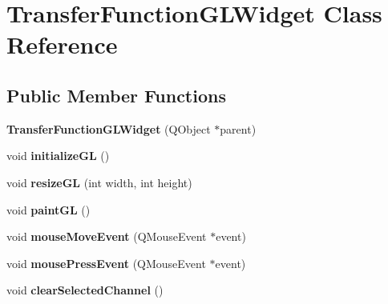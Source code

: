 \hypertarget{class_transfer_function_g_l_widget}{\section{\-Transfer\-Function\-G\-L\-Widget \-Class \-Reference}
\label{class_transfer_function_g_l_widget}
}
\subsection*{\-Public \-Member \-Functions}
\begin{DoxyCompactItemize}
\item 
\hypertarget{class_transfer_function_g_l_widget_afca47789bf3dba39c9e5dbaf334ddf0b}{{\bfseries \-Transfer\-Function\-G\-L\-Widget} (\-Q\-Object $\ast$parent)}\label{class_transfer_function_g_l_widget_afca47789bf3dba39c9e5dbaf334ddf0b}

\item 
\hypertarget{class_transfer_function_g_l_widget_a0265d1baafc123816c995168b024c1fe}{void {\bfseries initialize\-G\-L} ()}\label{class_transfer_function_g_l_widget_a0265d1baafc123816c995168b024c1fe}

\item 
\hypertarget{class_transfer_function_g_l_widget_a195a79448e90a6c0fedaa04d4f5eb3d5}{void {\bfseries resize\-G\-L} (int width, int height)}\label{class_transfer_function_g_l_widget_a195a79448e90a6c0fedaa04d4f5eb3d5}

\item 
\hypertarget{class_transfer_function_g_l_widget_a75db5ec3421b465f9be08720c4b2487a}{void {\bfseries paint\-G\-L} ()}\label{class_transfer_function_g_l_widget_a75db5ec3421b465f9be08720c4b2487a}

\item 
\hypertarget{class_transfer_function_g_l_widget_a22edf9c406fb165f470dbed341a47bb4}{void {\bfseries mouse\-Move\-Event} (\-Q\-Mouse\-Event $\ast$event)}\label{class_transfer_function_g_l_widget_a22edf9c406fb165f470dbed341a47bb4}

\item 
\hypertarget{class_transfer_function_g_l_widget_af189b557024ef930c9a8d93718de6b77}{void {\bfseries mouse\-Press\-Event} (\-Q\-Mouse\-Event $\ast$event)}\label{class_transfer_function_g_l_widget_af189b557024ef930c9a8d93718de6b77}

\item 
\hypertarget{class_transfer_function_g_l_widget_a07f59659501500b4bc529563107237a1}{void {\bfseries clear\-Selected\-Channel} ()}\label{class_transfer_function_g_l_widget_a07f59659501500b4bc529563107237a1}


\end{DoxyCompactItemize}
